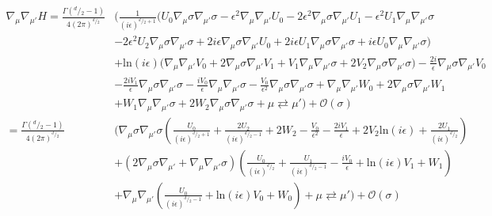 \documentclass[a4paper,11pt]{article}
\numberwithin{equation}{section}
\theoremstyle{definition}
\newcommand{\dd}{{^d\!/\!_2}}
\begin{document}
\begin{align*}
    \nabla_\mu\nabla_{\mu'} H
    = \frac{\Gamma\left(\dd -1\right)}{4 (2\pi)^\dd} &\Bigg(\frac{1}{(i\epsilon)^{\dd+1}}\big(
    U_0 \nabla_\mu \sigma \nabla_{\mu'} \sigma
    -\epsilon^2 \nabla_\mu \nabla_{\mu'} U_0
    -2 \epsilon^2 \nabla_\mu \sigma \nabla_{\mu'} U_1
    -\epsilon^2 U_1 \nabla_\mu \nabla_{\mu'} \sigma\\
    &-2\epsilon^2 U_2 \nabla_\mu \sigma \nabla_{\mu'} \sigma
    + 2 i\epsilon  \nabla_\mu \sigma \nabla_{\mu'} U_0
    + 2 i\epsilon  U_1 \nabla_\mu \sigma \nabla_{\mu'} \sigma
    + i \epsilon U_0 \nabla_\mu \nabla_{\mu'} \sigma\big)\\
    &+ \mathrm{ln}(i\epsilon) \big(
    \nabla_\mu\nabla_{\mu'} V_0
    + 2 \nabla_\mu \sigma\nabla_{\mu'} V_1 
    + V_1 \nabla_\mu\nabla_{\mu'} \sigma
    +2 V_2 \nabla_\mu \sigma \nabla_{\mu'} \sigma\big) 
    - \frac{2i}{\epsilon}\nabla_\mu \sigma \nabla_{\mu'} V_0\\
    &- \frac{2iV_1}{\epsilon}\nabla_\mu \sigma \nabla_{\mu'} \sigma
    - \frac{iV_0}{\epsilon} \nabla_\mu\nabla_{\mu'}\sigma
    - \frac{V_0}{\epsilon^2}\nabla_\mu \sigma \nabla_{\mu'} \sigma
    + \nabla_\mu\nabla_{\mu'} W_0
    + 2 \nabla_\mu \sigma \nabla_{\mu'} W_1\\
    &+ W_1 \nabla_\mu\nabla_{\mu'} \sigma
    + 2 W_2 \nabla_\mu \sigma \nabla_{\mu'} \sigma
    + \mu \rightleftarrows {\mu'}
    \Bigg) + \mathcal{O}(\sigma)
    \\
    = \frac{\Gamma\left(\dd -1\right)}{4 (2\pi)^\dd} &\Bigg(
    \nabla_\mu\sigma\nabla_{\mu'}\sigma \left(
      \frac{U_0}{(i\epsilon)^{\dd+1}} 
    + \frac{2U_2}{(i\epsilon)^{\dd-1}}
    + 2 W_2
    - \frac{V_0}{\epsilon^2}
    - \frac{2iV_1}{\epsilon}
    +2 V_2 \mathrm{ln}(i\epsilon)
    + \frac{2U_1}{(i\epsilon)^{\dd}}
    \right)\\
    &+ \left(2 \nabla_\mu \sigma \nabla_{\mu'} + \nabla_\mu \nabla_{\mu'} \sigma\right) \left(
      \frac{U_0}{(i\epsilon)^{\dd}}  
    + \frac{U_1}{(i\epsilon)^{\dd-1}} 
    - \frac{iV_0}{\epsilon}
    + \mathrm{ln}(i\epsilon) V_1 
    + W_1
    \right)\\%
    &+ \nabla_\mu \nabla_{\mu'} \left(
    \frac{U_0}{(i\epsilon)^{\dd-1}} 
    + \mathrm{ln}(i\epsilon) V_0
    + W_0\right)
    + \mu \rightleftarrows {\mu'}
    \Bigg) + \mathcal{O}(\sigma)
\end{align*}
\end{document}
